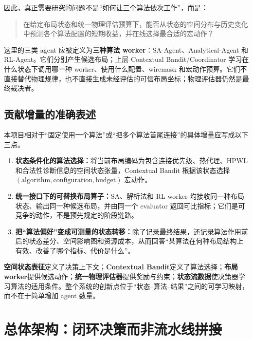 \documentclass[UTF8,a4paper,11pt]{ctexart}
\newcommand{\important}[1]{\textbf{#1}}
\begin{document}
因此，真正需要研究的问题不是“如何让三个算法依次工作”，而是：

\begin{quote}
在给定布局状态和统一物理评估预算下，能否从状态的空间分布与历史变化中预测各个算法配置的短期收益，并在线选择最合适的宏动作？
\end{quote}

这里的三类 agent 应被定义为\important{三种算法 worker}：SA-Agent、Analytical-Agent 和 RL-Agent。它们分别产生候选布局；上层 Contextual Bandit/Coordinator 学习在什么状态下调用哪一种 worker、使用什么配置、wiremask 和宏动作预算。它们不直接替代物理规律，也不直接生成未经评估的可信布局坐标；物理评估器仍然是最终裁决者。

\subsection{贡献增量的准确表述}

本项目相对于“固定使用一个算法”或“把多个算法首尾连接”的具体增量应写成以下三点。

\begin{enumerate}
    \item \textbf{状态条件化的算法选择：}将当前布局编码为包含连接优先级、热代理、HPWL 和合法性诊断信息的空间状态张量，Contextual Bandit 根据该状态选择 \((\text{algorithm},\text{configuration},\text{budget})\) 宏动作。
    \item \textbf{统一接口下的可替换布局算子：}SA、解析法和 RL worker 均接收同一种布局状态、输出同一种候选布局，并由同一个 evaluator 返回可比指标；它们是可竞争的动作，不是预先规定的阶段链路。
    \item \textbf{把“算法偏好”变成可测量的状态转移：}除了记录最终结果，还记录算法作用前后的状态差分、空间影响图和资源成本，从而回答“某算法在何种布局结构上有效、改善了哪个指标、代价是什么”。
\end{enumerate}

\begin{tcolorbox}[colback=lightgreen,colframe=green!45!black,title=论文主线]
\textbf{空间状态表征}定义了决策上下文；\textbf{Contextual Bandit}定义了算法选择；\textbf{布局 worker}提供候选动作；\textbf{统一物理评估器}提供奖励与约束；\textbf{状态流数据}使决策器学习算法的适用条件。整个系统的创新点位于“状态--算法--结果”之间的可学习映射，而不在于简单增加 agent 数量。
\end{tcolorbox}

\section{总体架构：闭环决策而非流水线拼接}
\end{document}

